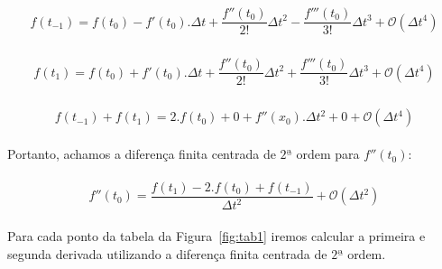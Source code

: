 \documentclass[12pt]{article}
\begin{document}
\begin{eqnarray}
\begin{split}
f(t_{-1}) =  f(t_{0}) - f'(t_{0}).\Delta t + \dfrac{f''(t_{0})}{2!} \Delta t^{2} - \dfrac{f'''(t_{0})}{3!} \Delta t^{3} + \mathcal{O}(\Delta t^{4})
\end{split}
\end{eqnarray}

\begin{eqnarray}
\begin{split}
f(t_{1}) =  f(t_{0}) + f'(t_{0}).\Delta t + \dfrac{f''(t_{0})}{2!} \Delta t^{2} + \dfrac{f'''(t_{0})}{3!} \Delta t^{3} + \mathcal{O}(\Delta t^{4})
\end{split}
\end{eqnarray}

\begin{eqnarray}
\begin{split}
f(t_{-1}) + f(t_{1}) =  2.f(t_{0}) + 0 + f''(x_{0}).\Delta t^{2} + 0 + \mathcal{O}(\Delta t^{4})
\end{split}
\end{eqnarray}

Portanto, achamos a diferença finita centrada de $2ª$ ordem para $f''(t_{0})$: 

\begin{eqnarray}
\begin{split}
f''(t_{0}) = \dfrac{f(t_{1}) - 2.f(t_{0}) + f(t_{-1})}{\Delta t^{2}} + \mathcal{O}(\Delta t^{2})
\end{split}
\end{eqnarray}

Para cada ponto da tabela da Figura~\ref{fig:tab1} iremos calcular a primeira e segunda derivada utilizando a diferença finita centrada de $2ª$ ordem. 
\end{document}
